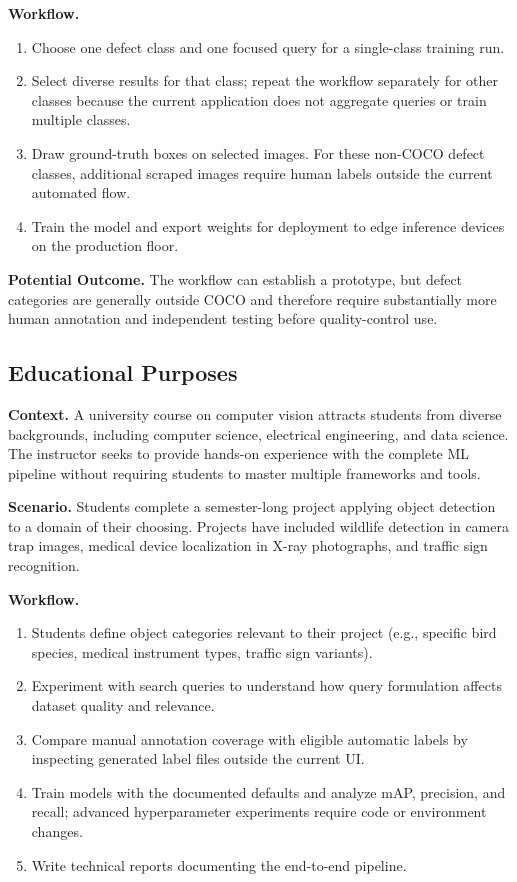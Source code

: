 \documentclass[12pt, letterpaper]{article}
\begin{document}
\textbf{Workflow.}
\begin{enumerate}
  \item Choose one defect class and one focused query for a single-class training run.
  \item Select diverse results for that class; repeat the workflow separately for other
    classes because the current application does not aggregate queries or train multiple classes.
  \item Draw ground-truth boxes on selected images. For these non-COCO defect classes,
    additional scraped images require human labels outside the current automated flow.
  \item Train the model and export weights for deployment to edge inference devices on
    the production floor.
\end{enumerate}

\textbf{Potential Outcome.} The workflow can establish a prototype, but defect categories
are generally outside COCO and therefore require substantially more human annotation and
independent testing before quality-control use.

\subsection{Educational Purposes}

\textbf{Context.} A university course on computer vision attracts students from diverse
backgrounds, including computer science, electrical engineering, and data science. The
instructor seeks to provide hands-on experience with the complete ML pipeline without
requiring students to master multiple frameworks and tools.

\textbf{Scenario.} Students complete a semester-long project applying object detection to
a domain of their choosing. Projects have included wildlife detection in camera trap images,
medical device localization in X-ray photographs, and traffic sign recognition.

\textbf{Workflow.}
\begin{enumerate}
  \item Students define object categories relevant to their project (e.g., specific bird
    species, medical instrument types, traffic sign variants).
  \item Experiment with search queries to understand how query formulation affects dataset
    quality and relevance.
  \item Compare manual annotation coverage with eligible automatic labels by inspecting
    generated label files outside the current UI.
  \item Train models with the documented defaults and analyze mAP, precision, and recall;
    advanced hyperparameter experiments require code or environment changes.
  \item Write technical reports documenting the end-to-end pipeline.
\end{enumerate}
\end{document}
